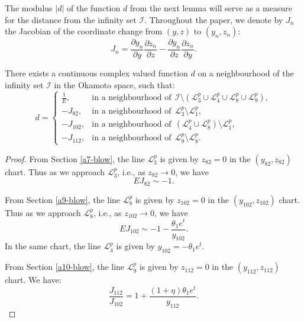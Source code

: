 The modulus $|d|$ of the function $d$ from the next lemma will serve as a measure for the distance from the infinity set $\mathcal{I}$.
Throughout the paper, we denote by $J_{n}$ the Jacobian of the coordinate change from $(y,z)$ to $(y_{n},z_{n})$:
$$
J_{n}=\frac{\partial y_{n}}{\partial y}\frac{\partial z_{n}}{\partial z}-\frac{\partial y_{n}}{\partial z}\frac{\partial z_{n}}{\partial y}.
$$

\begin{lemma}
There exists a continuous complex valued function $d$ on a neighbourhood of the infinity set $\mathcal{I}$ in the Okamoto space, such that:
$$
d=
\begin{cases}
\frac1E, & \text{in a neighbourhood of}\ \ \mathcal{I}\setminus(\mathcal{L}_3^p\cup\mathcal{L}_4^p\cup\mathcal{L}_8^p\cup\mathcal{L}_9^p),
\\
-J_{82}, & \text{in a neighbourhood of}\ \ \mathcal{L}_3^p\setminus\mathcal{L}_1^p,
\\
-J_{102}, & \text{in a neighbourhood of}\ \ (\mathcal{L}_4^p\cup\mathcal{L}_8^p)\setminus\mathcal{L}_1^p,
\\
-J_{112}, & \text{in a neighbourhood of}\ \ \mathcal{L}_9^p\setminus\mathcal{L}_8^p.
\end{cases}
$$
\end{lemma}

\begin{proof}


From Section \ref{a7-blow}, the line $\mathcal{L}_{3}^p$ is given by $z_{82}=0$ in the $(y_{82},z_{82})$ chart.
Thus as we approach $\mathcal{L}_{3}^p$, i.e., as $z_{82}\to0$, we have
$$
EJ_{82}\sim-1.
$$


From Section \ref{a9-blow}, the line $\mathcal{L}_{8}^p$ is given by $z_{102}=0$ in the $(y_{102},z_{102})$ chart.
Thus as we approach $\mathcal{L}_{8}^p$, i.e., as $z_{102}\to0$, we have
$$
EJ_{102}\sim-1-\frac{\theta_1 e^t}{y_{102}}.
$$
In the same chart, the line $\mathcal{L}_{4}^p$ is given by $y_{102}=-\theta_1e^t$.

From Section \ref{a10-blow}, the line $\mathcal{L}_9^p$ is given by $z_{112}=0$ in the  $(y_{112},z_{112})$ chart.
We have:
$$
\frac{J_{112}}{J_{102}}=1+\frac{(1+\eta)\theta_1 e^t}{y_{112}}.
$$
 \end{proof}
 
